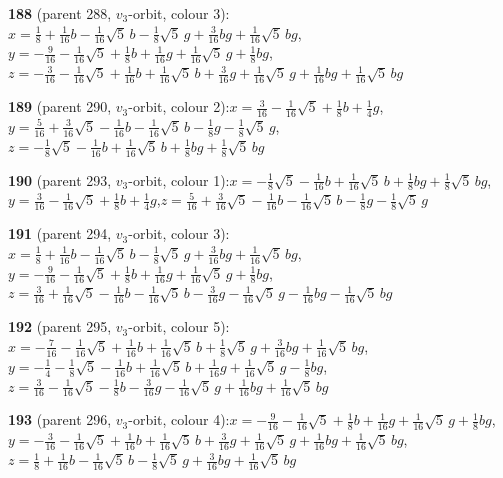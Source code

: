 \documentclass[10pt]{article}
\begin{document}
{\noindent\textbf{188} (parent 288, $v_3$-orbit, colour 3):\quad $x=\tfrac{1}{8}+\tfrac{1}{16}b-\tfrac{1}{16}\sqrt5\,b-\tfrac{1}{8}\sqrt5\,g+\tfrac{3}{16}bg+\tfrac{1}{16}\sqrt5\,bg$,\quad $y=-\tfrac{9}{16}-\tfrac{1}{16}\sqrt5+\tfrac{1}{8}b+\tfrac{1}{16}g+\tfrac{1}{16}\sqrt5\,g+\tfrac{1}{8}bg$,\quad $z=-\tfrac{3}{16}-\tfrac{1}{16}\sqrt5+\tfrac{1}{16}b+\tfrac{1}{16}\sqrt5\,b+\tfrac{3}{16}g+\tfrac{1}{16}\sqrt5\,g+\tfrac{1}{16}bg+\tfrac{1}{16}\sqrt5\,bg$\par\smallskip
\noindent\textbf{189} (parent 290, $v_3$-orbit, colour 2):\quad $x=\tfrac{3}{16}-\tfrac{1}{16}\sqrt5+\tfrac{1}{8}b+\tfrac{1}{4}g$,\quad $y=\tfrac{5}{16}+\tfrac{3}{16}\sqrt5-\tfrac{1}{16}b-\tfrac{1}{16}\sqrt5\,b-\tfrac{1}{8}g-\tfrac{1}{8}\sqrt5\,g$,\quad $z=-\tfrac{1}{8}\sqrt5-\tfrac{1}{16}b+\tfrac{1}{16}\sqrt5\,b+\tfrac{1}{8}bg+\tfrac{1}{8}\sqrt5\,bg$\par\smallskip
\noindent\textbf{190} (parent 293, $v_3$-orbit, colour 1):\quad $x=-\tfrac{1}{8}\sqrt5-\tfrac{1}{16}b+\tfrac{1}{16}\sqrt5\,b+\tfrac{1}{8}bg+\tfrac{1}{8}\sqrt5\,bg$,\quad $y=\tfrac{3}{16}-\tfrac{1}{16}\sqrt5+\tfrac{1}{8}b+\tfrac{1}{4}g$,\quad $z=\tfrac{5}{16}+\tfrac{3}{16}\sqrt5-\tfrac{1}{16}b-\tfrac{1}{16}\sqrt5\,b-\tfrac{1}{8}g-\tfrac{1}{8}\sqrt5\,g$\par\smallskip
\noindent\textbf{191} (parent 294, $v_3$-orbit, colour 3):\quad $x=\tfrac{1}{8}+\tfrac{1}{16}b-\tfrac{1}{16}\sqrt5\,b-\tfrac{1}{8}\sqrt5\,g+\tfrac{3}{16}bg+\tfrac{1}{16}\sqrt5\,bg$,\quad $y=-\tfrac{9}{16}-\tfrac{1}{16}\sqrt5+\tfrac{1}{8}b+\tfrac{1}{16}g+\tfrac{1}{16}\sqrt5\,g+\tfrac{1}{8}bg$,\quad $z=\tfrac{3}{16}+\tfrac{1}{16}\sqrt5-\tfrac{1}{16}b-\tfrac{1}{16}\sqrt5\,b-\tfrac{3}{16}g-\tfrac{1}{16}\sqrt5\,g-\tfrac{1}{16}bg-\tfrac{1}{16}\sqrt5\,bg$\par\smallskip
\noindent\textbf{192} (parent 295, $v_3$-orbit, colour 5):\quad $x=-\tfrac{7}{16}-\tfrac{1}{16}\sqrt5+\tfrac{1}{16}b+\tfrac{1}{16}\sqrt5\,b+\tfrac{1}{8}\sqrt5\,g+\tfrac{3}{16}bg+\tfrac{1}{16}\sqrt5\,bg$,\quad $y=-\tfrac{1}{4}-\tfrac{1}{8}\sqrt5-\tfrac{1}{16}b+\tfrac{1}{16}\sqrt5\,b+\tfrac{1}{16}g+\tfrac{1}{16}\sqrt5\,g-\tfrac{1}{8}bg$,\quad $z=\tfrac{3}{16}-\tfrac{1}{16}\sqrt5-\tfrac{1}{8}b-\tfrac{3}{16}g-\tfrac{1}{16}\sqrt5\,g+\tfrac{1}{16}bg+\tfrac{1}{16}\sqrt5\,bg$\par\smallskip
\noindent\textbf{193} (parent 296, $v_3$-orbit, colour 4):\quad $x=-\tfrac{9}{16}-\tfrac{1}{16}\sqrt5+\tfrac{1}{8}b+\tfrac{1}{16}g+\tfrac{1}{16}\sqrt5\,g+\tfrac{1}{8}bg$,\quad $y=-\tfrac{3}{16}-\tfrac{1}{16}\sqrt5+\tfrac{1}{16}b+\tfrac{1}{16}\sqrt5\,b+\tfrac{3}{16}g+\tfrac{1}{16}\sqrt5\,g+\tfrac{1}{16}bg+\tfrac{1}{16}\sqrt5\,bg$,\quad $z=\tfrac{1}{8}+\tfrac{1}{16}b-\tfrac{1}{16}\sqrt5\,b-\tfrac{1}{8}\sqrt5\,g+\tfrac{3}{16}bg+\tfrac{1}{16}\sqrt5\,bg$\par\smallskip
}
\end{document}
